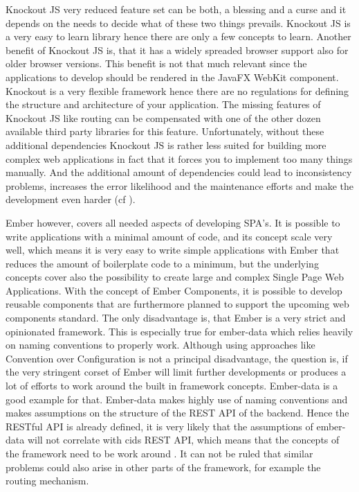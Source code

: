 Knockout JS very reduced feature set can be both, a blessing and a curse and it depends on the needs to decide what of these two things prevails.
Knockout JS is a very easy to learn library hence there are only a few concepts to learn.
Another benefit of Knockout JS is, that it has a widely spreaded browser support also for older browser versions.
This benefit is not that much relevant since the applications to develop should be rendered in the JavaFX WebKit component.
Knockout is a very flexible framework hence there are  no regulations for defining the structure and architecture of your  application.
The missing features of Knockout JS like routing can be compensated with one of the other dozen available third party libraries for this feature.
Unfortunately, without these additional dependencies Knockout JS is rather less suited for building more complex web applications in fact that it forces you to implement too many things manually.
And the additional amount of dependencies could lead to inconsistency problems, increases the error likelihood and the maintenance efforts and make the development even harder (cf \autocite{heise_knockout}).  

Ember however, covers all needed aspects of developing SPA's. 
It is possible to write applications with a minimal amount of code, and its concept scale very well, which means it is very easy to write simple applications with Ember that reduces the amount of boilerplate code to a minimum, but the underlying concepts cover also the possibility to create large and complex Single Page Web Applications. With the concept of Ember Components, it is possible to develop reusable components that are furthermore planned to support the upcoming web components standard. 
The only disadvantage is, that Ember is a very strict and opinionated framework.
This is especially true for ember-data which relies heavily on naming conventions to properly work.
Although using approaches like Convention over Configuration is not a principal disadvantage, the question is, if the very stringent corset of Ember will limit further developments or produces a lot of efforts to work around the built in framework concepts.
Ember-data is a good example for that.
Ember-data makes highly use of naming conventions and makes assumptions on the structure of the REST API of the backend. Hence the RESTful API is already defined, it is very likely that the assumptions of ember-data will not correlate with cids REST API, which means that the concepts of the framework need to be work around .
It can not be ruled  that similar problems could also arise in other parts of the framework, for example the routing mechanism.

